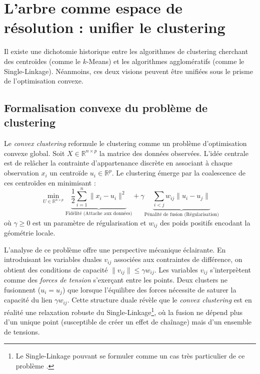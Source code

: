 \section{L'arbre comme espace de résolution : unifier le clustering}

Il existe une dichotomie historique entre les algorithmes de clustering cherchant des centroïdes (comme le $k$-Means) et les algorithmes agglomératifs (comme le Single-Linkage). Néanmoins, ces deux visions peuvent être unifiées sous le prisme de l'optimisation convexe.

\subsection{Formalisation convexe du problème de clustering}
\label{sec:convex_clustering}

Le \emph{convex clustering} \cite{hocking2011clusterpath, chi2015splitting} reformule le clustering comme un problème d'optimisation convexe global. Soit $X \in \mathbb{R}^{n \times p}$ la matrice des données observées. L'idée centrale est de relâcher la contrainte d'appartenance discrète en associant à chaque observation $x_i$ un centroïde $u_i \in \mathbb{R}^{p}$. Le clustering émerge par la coalescence de ces centroïdes en minimisant :
\[
    \min_{U \in \mathbb{R}^{n \times p}} \underbrace{\frac{1}{2} \sum_{i=1}^n \|x_i - u_i\|^2}_{\text{Fidélité (Attache aux données)}} + \gamma \underbrace{\sum_{i < j} w_{ij} \|u_i - u_j\|}_{\text{Pénalité de fusion (Régularisation)}}
    \label{eq:convex_clustering}
\]
où $\gamma \ge 0$ est un paramètre de régularisation et $w_{ij}$ des poids positifs encodant la géométrie locale. 

L'analyse de ce problème \cite{tan2015statistical} offre une perspective mécanique éclairante. En introduisant les variables duales $v_{ij}$ associées aux contraintes de différence, on obtient des conditions de capacité $\|v_{ij}\| \le \gamma w_{ij}$. Les variables $v_{ij}$ s'interprètent comme des \emph{forces de tension} s'exerçant entre les points. Deux clusters ne fusionnent ($u_i = u_j$) que lorsque l'équilibre des forces nécessite de saturer la capacité du lien $\gamma w_{ij}$. Cette structure duale révèle que le \emph{convex clustering} est en réalité une relaxation robuste du Single-Linkage\footnote{Le Single-Linkage pouvant se formuler comme un cas très particulier de ce problème \cite{tan2015statistical}.}, où la fusion ne dépend plus d'un unique point (susceptible de créer un effet de chaînage) mais d'un ensemble de tensions. 

